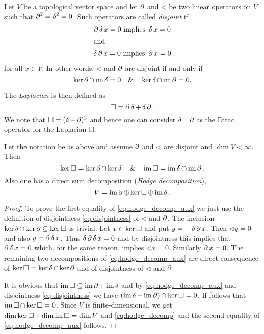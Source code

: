 Let $V$ be a topological vector space and let $\lcd$ and $\lhd$ be two linear operators on $V$ such that $\lcd^2 = \lhd^2 = 0$. Such operators are called \emph{disjoint} if
\begin{gather*}
 \lcd\lhd x= 0 \text{ implies } \lhd x =0 \\
 \intertext{and}
 \lhd \lcd x = 0 \text{ implies } \lcd x = 0
\end{gather*}
for all $x\in V$. In other words, $\lhd$ and $\lcd$ are disjoint if and only if
\begin{equation}\label{eq:disjointness}
 \ker \lcd \cap \im \lhd = 0 \quad \& \quad \ker \lhd \cap \im \lcd = 0.
\end{equation}


The \emph{Laplacian} is then defined as
\[\lap = \lcd \lhd + \lhd \lcd.\] We note that $\lap  = (\lhd + \lcd)^2$ and hence one can consider $\lhd + \lcd$ as the Dirac operator for the Laplacian $\lap$. %

\begin{proposition}%
 Let the notation be as above and assume $\lcd$ and $\lhd$ are disjoint and $\dim V < \infty$. Then
 \begin{equation}\label{eq:hodge_decomp_aux}
  \ker \lap = \ker \lcd \cap \ker\lhd \quad \& \quad  \im \lap = \im \lhd \oplus \im \lcd.
 \end{equation}
 Also one has a direct sum decomposition (\emph{Hodge decomposition}),
 \begin{equation}\label{eq:hodge_decomp}
    V = \im \lcd \oplus \ker \lap \oplus \im \lhd.
 \end{equation}
\end{proposition}
\begin{proof}
To prove the first equality of \eqref{eq:hodge_decomp_aux} we just use the definition of disjointness \eqref{eq:disjointness} of $\lhd$ and $\lcd$. The inclusion $\ker \lhd \cap \ker \lcd \subseteq \ker\lap$ is trivial. Let $x \in \ker \lap$ and put $y=-\lhd\lcd x$. Then $\lhd y =0$ and also $y =\lcd\lhd x$. Thus $\lhd\lcd\lhd x = 0$ and by disjointness this implies that $\lcd\lhd x = 0$ which, for the same reason, implies $\lhd x = 0$. Similarly $\lcd x = 0$. The remaining two decompositions of \eqref{eq:hodge_decomp_aux} are direct consequence of $\ker\lap = \ker\lhd\cap\ker\lcd$ and of disjointness of $\lhd$ and $\lcd$.

 It is obvious that $\im \lap \subseteq \im \lcd + \im \lhd$ and  by \eqref{eq:hodge_decomp_aux} and disjointness \eqref{eq:disjointness} we have $(\im \lhd + \im \lcd) \cap \ker \lap = 0$. If follows that $\im \lap \cap \ker \lap =0$. Since $V$ is finite-dimensional, we get $\dim \ker\lap + \dim \im \lap = \dim V$ and \eqref{eq:hodge_decomp}  and the second equality of \eqref{eq:hodge_decomp_aux} follows.
\end{proof}

